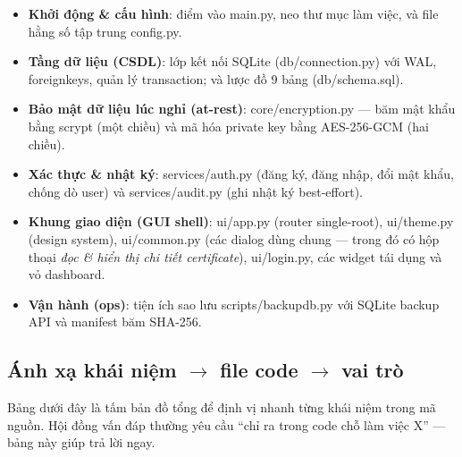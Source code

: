 \documentclass[12pt,a4paper]{article}
\newcommand{\code}[1]{{\ttfamily\small\def\_{\textunderscore\discretionary{}{}{}}#1}}
\begin{document}
\begin{itemize}
  \item \textbf{Khởi động \& cấu hình}: điểm vào \code{main.py}, neo thư mục làm
        việc, và file hằng số tập trung \code{config.py}.
  \item \textbf{Tầng dữ liệu (CSDL)}: lớp kết nối SQLite (\code{db/connection.py})
        với WAL, \code{foreign\_keys}, quản lý transaction; và lược đồ 9 bảng
        (\code{db/schema.sql}).
  \item \textbf{Bảo mật dữ liệu lúc nghỉ (at-rest)}: \code{core/encryption.py} —
        băm mật khẩu bằng scrypt (một chiều) và mã hóa private key bằng
        AES-256-GCM (hai chiều).
  \item \textbf{Xác thực \& nhật ký}: \code{services/auth.py} (đăng ký, đăng nhập,
        đổi mật khẩu, chống dò user) và \code{services/audit.py} (ghi nhật ký
        best-effort).
  \item \textbf{Khung giao diện (GUI shell)}: \code{ui/app.py} (router single-root),
        \code{ui/theme.py} (design system), \code{ui/common.py} (các dialog dùng
        chung — trong đó có hộp thoại \emph{đọc \& hiển thị chi tiết certificate}),
        \code{ui/login.py}, các widget tái dụng và vỏ dashboard.
  \item \textbf{Vận hành (ops)}: tiện ích sao lưu \code{scripts/backup\_db.py}
        với SQLite backup API và manifest băm SHA-256.
\end{itemize}

\subsection{Ánh xạ khái niệm $\to$ file code $\to$ vai trò}

Bảng dưới đây là tấm bản đồ tổng để định vị nhanh từng khái niệm trong mã nguồn.
Hội đồng vấn đáp thường yêu cầu ``chỉ ra trong code chỗ làm việc X'' — bảng này
giúp trả lời ngay.
\end{document}
